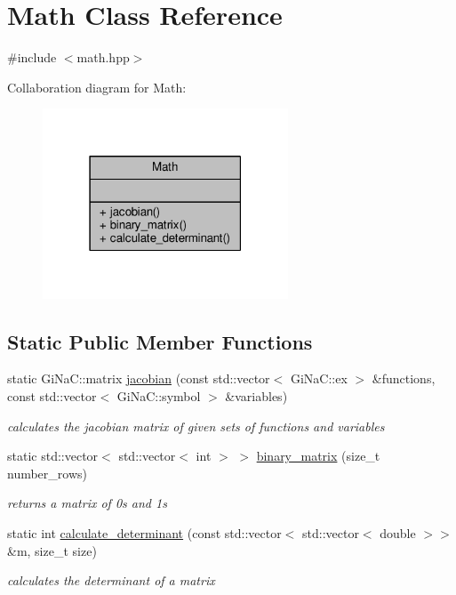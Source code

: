 \hypertarget{classMath}{}\section{Math Class Reference}
\label{classMath}


{\ttfamily \#include $<$math.\+hpp$>$}



Collaboration diagram for Math\+:
\nopagebreak
\begin{figure}[H]
\begin{center}
\leavevmode
\includegraphics[width=207pt]{classMath__coll__graph}
\end{center}
\end{figure}
\subsection*{Static Public Member Functions}
\begin{DoxyCompactItemize}
\item 
static Gi\+Na\+C\+::matrix \mbox{\hyperlink{classMath_ab5ce1f51bb8c302d966581c9a77f1d66}{jacobian}} (const std\+::vector$<$ Gi\+Na\+C\+::ex $>$ \&functions, const std\+::vector$<$ Gi\+Na\+C\+::symbol $>$ \&variables)
\begin{DoxyCompactList}\small\item\em calculates the jacobian matrix of given sets of functions and variables \end{DoxyCompactList}\item 
static std\+::vector$<$ std\+::vector$<$ int $>$ $>$ \mbox{\hyperlink{classMath_a59af3c9e62ca5318cc7cbb4de4d53709}{binary\+\_\+matrix}} (size\+\_\+t number\+\_\+rows)
\begin{DoxyCompactList}\small\item\em returns a matrix of 0s and 1s \end{DoxyCompactList}\item 
static int \mbox{\hyperlink{classMath_a98e10539ebd03ed6705aee8e184da32b}{calculate\+\_\+determinant}} (const std\+::vector$<$ std\+::vector$<$ double $>$$>$ \&m, size\+\_\+t size)
\begin{DoxyCompactList}\small\item\em calculates the determinant of a matrix \end{DoxyCompactList}\end{DoxyCompactItemize}



